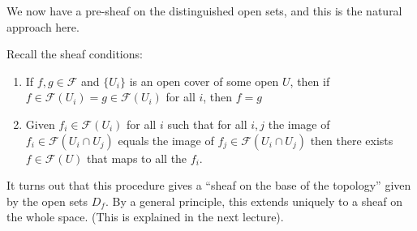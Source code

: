         We now have a pre-sheaf on the distinguished open sets, and this is the natural approach here.

        Recall the sheaf conditions:
        \begin{enumerate}
            \item If $f,g\in\mathcal{F}$ and $\{U_i\}$ is an open cover of some open $U$, then if $f\in\mathcal{F}(U_i)=g\in\mathcal{F}(U_i)$ for all $i$, then $f=g$
            \item Given $f_i\in\mathcal{F}(U_i)$ for all $i$ such that for all $i,j$ the image of $f_i\in\mathcal{F}(U_i\cap U_j)$ equals the image of $f_j\in\mathcal{F}(U_i\cap U_j)$ then there exists $f\in\mathcal{F}(U)$ that maps to all the $f_i$.
            \end{enumerate}

            It turns out that this procedure gives a ``sheaf on the base of the topology'' given by the open sets \(D_f\).
            By a general principle, this extends uniquely to a sheaf on the whole space.
            (This is explained in the next lecture).





